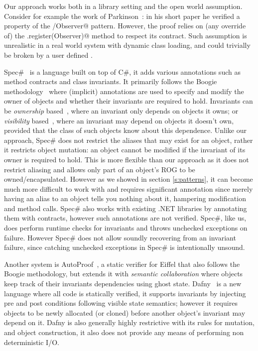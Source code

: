 Our approach works both  in a library setting and the open world assumption.
Consider for example the work of Parkinson~\cite{parkinson2007class}: in his short paper he verified a property of the \Q@Subject/Observer@ pattern. However, the proof relies on (any override of) the \Q@Subject.register(Observer)@ method to respect its contract. Such assumption is unrealistic in a real world system with dynamic class loading, and could trivially be broken by a user defined \Q@EvilSubject@.

Spec\#~\cite{Barnett:2004:SPS:2131546.2131549} is a language built on top of C\#, it adds various annotations such as method contracts and class invariants. 
It primarily follows the Boogie methodology~\cite{DBLP:journals/tcs/NaumannB06} where (implicit) annotations are used to specify and modify the owner of objects and whether their invariants are required to hold. Invariants can be \emph{ownership} based~\cite{DBLP:journals/jot/BarnettDFLS04}, where an invariant only depends on objects it owns; or \emph{visibility} based~\cite{DBLP:conf/mpc/BarnettN04,DBLP:conf/ecoop/LeinoM04}, where an invariant may depend on objects it doesn't own, provided that the class of such objects know about this dependence. Unlike our approach, Spec\# does not restrict the aliases that may exist for an object, rather it restricts object mutation: an object cannot be modified if the invariant of its owner is required to hold. This is more flexible than our approach as it does not restrict aliasing and allows only part of an object's ROG to be owned/encapsulated. However as we showed in section \ref{s:patterns}, it can become much more difficult to work with and requires significant annotation since merely having an alias to an object tells you nothing about it, hampering modification and method calls. Spec\# also works with existing .NET libraries by annotating them with contracts, however such annotations are not verified. Spec\#, like us, does perform runtime checks for invariants and throws unchecked exceptions on failure.  However Spec\# does not allow soundly recovering from an invariant failure, since catching unchecked exceptions in Spec\# is intentionally unsound.~\cite{Leino2004ExceptionSF}


Another system is AutoProof~\cite{DBLP:conf/fm/PolikarpovaTFM14}, a static verifier for Eiffel that also follows the Boogie methodology, but extends it with \emph{semantic collaboration} where objects keep track of their invariants dependencies using ghost state.
Dafny~\cite{DBLP:conf/sigada/Leino12} is a new language where all code is statically verified, it supports invariants by injecting pre and post conditions following visible state semantics;
however it requires objects to be newly allocated (or cloned) before another object's invariant may depend on it.
Dafny is also generally highly restrictive with its rules for mutation, and object construction, it also does not provide any means of performing non deterministic I/O.



